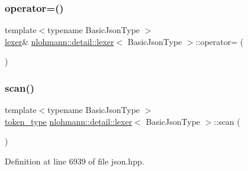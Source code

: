 \mbox{\label{classnlohmann_1_1detail_1_1lexer_af8ab91a774484fa220ba073421c8f452}} 
\subsubsection{\texorpdfstring{operator=()}{operator=()}\hspace{0.1cm}{\footnotesize\ttfamily [2/2]}}
{\footnotesize\ttfamily template$<$typename Basic\+Json\+Type $>$ \\
\mbox{\hyperlink{classnlohmann_1_1detail_1_1lexer}{lexer}}\& \mbox{\hyperlink{classnlohmann_1_1detail_1_1lexer}{nlohmann\+::detail\+::lexer}}$<$ Basic\+Json\+Type $>$\+::operator= (\begin{DoxyParamCaption}\item[{\mbox{\hyperlink{classnlohmann_1_1detail_1_1lexer}{lexer}}$<$ Basic\+Json\+Type $>$ \&\&}]{ }\end{DoxyParamCaption})\hspace{0.3cm}{\ttfamily [delete]}}

\mbox{\label{classnlohmann_1_1detail_1_1lexer_aac3041cd2b9291e64fee38db422863c9}} 
\subsubsection{\texorpdfstring{scan()}{scan()}}
{\footnotesize\ttfamily template$<$typename Basic\+Json\+Type $>$ \\
\mbox{\hyperlink{classnlohmann_1_1detail_1_1lexer_a3f313cdbe187cababfc5e06f0b69b098}{token\+\_\+type}} \mbox{\hyperlink{classnlohmann_1_1detail_1_1lexer}{nlohmann\+::detail\+::lexer}}$<$ Basic\+Json\+Type $>$\+::scan (\begin{DoxyParamCaption}{ }\end{DoxyParamCaption})\hspace{0.3cm}{\ttfamily [inline]}}



Definition at line 6939 of file json.\+hpp.

